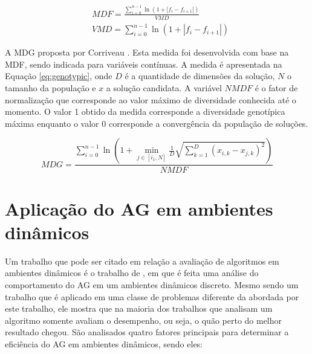 \begin{equation}
\label{eq:fenotype}
\begin{split}
& MDF = \frac{\sum_{i=0}^{n-1} \ln(1 + |f_i - f_{i+1}|)}{VMD} \\
& VMD = \sum_{i=0}^{n-1} \ln(1 + |f_i - f_{i+1}|)
\end{split}
\end{equation}

A MDG  proposta por Corriveau \cite{genotypic}. Esta medida foi desenvolvida com base na MDF, sendo indicada para variáveis contínuas. A medida é apresentada na Equação \ref{eq:genotypic}, onde $D$ é a quantidade de dimensões da solução, $N$ o tamanho da população e $x$ a solução candidata. A variável
$NMDF$ é o fator de normalização que corresponde ao valor máximo de diversidade conhecida até o momento. O valor 1 obtido da medida corresponde a diversidade genotípica máxima enquanto o valor 0 corresponde a convergência da população de soluções.

\begin{equation}
\label{eq:genotypic}
MDG = \frac{\sum_{i=0}^{n-1} \ln \left(1 + \min_{j \in [i_1,N]} \frac{1}{D} \sqrt{ \sum\limits_{k=1}^{D} (x_{i,k} - x_{j,k})^2}\right)}{NMDF}
\end{equation}

\section{Aplicação do AG em ambientes dinâmicos}
\label{sec:ag_behaviour}

Um trabalho que pode ser citado em relação a avaliação de algoritmos em ambientes dinâmicos é o trabalho de \cite{rand2005measurements}, em que é feita uma análise do comportamento do AG em um ambientes dinâmicos discreto. Mesmo sendo um trabalho que é aplicado em uma classe de problemas diferente da abordada por este trabalho, ele mostra que na maioria dos trabalhos que analisam um algoritmo somente avaliam o desempenho, ou seja, o quão perto do melhor resultado chegou. São analisados quatro fatores principais para determinar a eficiência do AG em ambientes dinâmicos, sendo eles:

